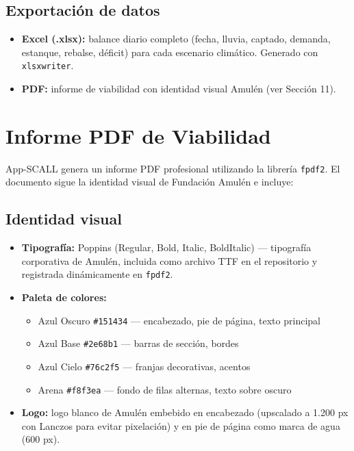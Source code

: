 \documentclass[12pt, a4paper]{article}
\begin{document}
\subsection{Exportación de datos}

\begin{itemize}
    \item \textbf{Excel (.xlsx):} balance diario completo (fecha, lluvia, captado, demanda, estanque, rebalse, déficit) para cada escenario climático. Generado con \texttt{xlsxwriter}.
    \item \textbf{PDF:} informe de viabilidad con identidad visual Amulén (ver Sección 11).
\end{itemize}

\section{Informe PDF de Viabilidad}

App-SCALL genera un informe PDF profesional utilizando la librería \texttt{fpdf2}. El documento sigue la identidad visual de Fundación Amulén e incluye:

\subsection{Identidad visual}

\begin{itemize}
    \item \textbf{Tipografía:} Poppins (Regular, Bold, Italic, BoldItalic) --- tipografía corporativa de Amulén, incluida como archivo TTF en el repositorio y registrada dinámicamente en \texttt{fpdf2}.
    \item \textbf{Paleta de colores:}
    \begin{itemize}
        \item Azul Oscuro \texttt{\#151434} --- encabezado, pie de página, texto principal
        \item Azul Base \texttt{\#2e68b1} --- barras de sección, bordes
        \item Azul Cielo \texttt{\#76c2f5} --- franjas decorativas, acentos
        \item Arena \texttt{\#f8f3ea} --- fondo de filas alternas, texto sobre oscuro
    \end{itemize}
    \item \textbf{Logo:} logo blanco de Amulén embebido en encabezado (upscalado a 1.200 px con Lanczos para evitar pixelación) y en pie de página como marca de agua (600 px).
\end{itemize}
\end{document}
